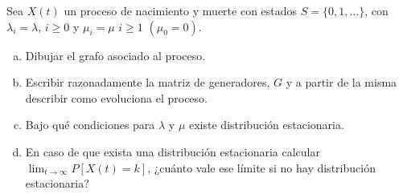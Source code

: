 \documentclass[twoside]{article}
\begin{document}
\newpage

\begin{ejercicio}{3}
Sea $X(t)$ un proceso de nacimiento y muerte con estados $S=\{0,1,\dotsc\}$, con $\lambda_i = \lambda$, $i\geq 0$ y $\mu_i = \mu $ $i\geq 1$ $(\mu_0 = 0)$.
\begin{enumerate}[a)]
\item Dibujar el grafo asociado al proceso.
\item Escribir razonadamente la matriz de generadores, $G$ y a partir de la misma describir como evoluciona el proceso.
\item Bajo qué condiciones para $\lambda$ y $\mu$ existe distribución estacionaria.
\item En caso de que exista una distribución estacionaria calcular $\lim_{t\to \infty}P[X(t)=k]$, ¿cuánto vale ese límite si no hay distribución estacionaria?
\end{enumerate}
\end{ejercicio}
\end{document}
